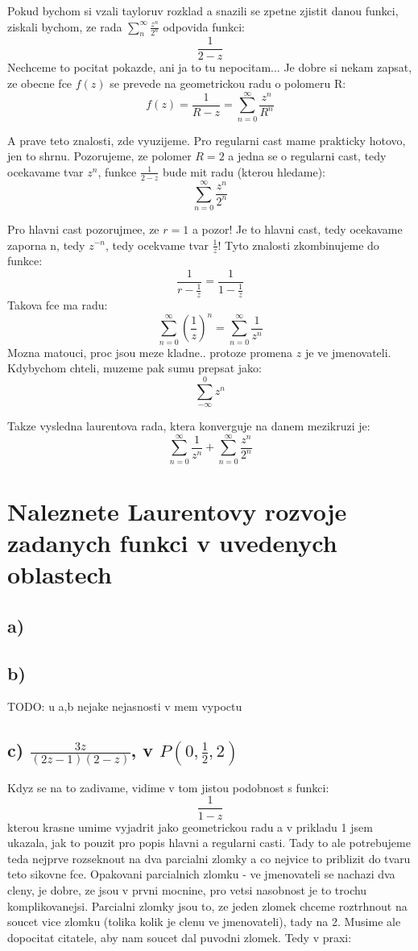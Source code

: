 Pokud bychom si vzali tayloruv rozklad a snazili se zpetne zjistit danou funkci, ziskali bychom, ze rada $\sum_n^\infty \frac{z^n}{2^n}$ odpovida funkci:
$$\frac{1}{2-z}$$
Nechceme to pocitat pokazde, ani ja to tu nepocitam... Je dobre si nekam zapsat, ze obecne fce $f(z)$ se prevede na geometrickou radu o polomeru R:
$$f(z) = \frac{1}{R-z} = \sum_{n=0}^\infty \frac{z^n}{R^n}$$

A prave teto znalosti, zde vyuzijeme. Pro regularni cast mame prakticky hotovo, jen to shrnu. Pozorujeme, ze polomer $R=2$ a jedna se o regularni cast, tedy ocekavame tvar $z^n$, funkce
$\frac{1}{2-z}$ bude mit radu (kterou hledame):
$$\sum_{n = 0}^\infty \frac{z^n}{2^n}$$

Pro hlavni cast pozorujmee, ze $r = 1$ a pozor! Je to hlavni cast, tedy ocekavame zaporna n, tedy $z^{-n}$, tedy ocekvame tvar $\frac{1}{z}$!
Tyto znalosti zkombinujeme do funkce:
$$\frac{1}{r-\frac{1}{z}} = \frac{1}{1-\frac{1}{z}}$$
Takova fce ma radu:
$$\sum_{n=0}^\infty \left( \frac{1}{z} \right)^n = \sum_{n=0} ^\infty \frac{1}{z^n}$$
Mozna matouci, proc jsou meze kladne.. protoze promena $z$ je ve jmenovateli. Kdybychom chteli, muzeme pak sumu prepsat jako:
$$\sum_{-\infty}^0 z^n$$

Takze vysledna laurentova rada, ktera konverguje na danem mezikruzi je:
$$\sum_{n=0} ^\infty \frac{1}{z^n}+\sum_{n = 0}^\infty \frac{z^n}{2^n}$$

\newpage

\section{Naleznete Laurentovy rozvoje zadanych funkci v uvedenych oblastech}
\subsection{a)}
\subsection{b)}
TODO: u a,b nejake nejasnosti v mem vypoctu

\subsection{c) $\frac{3z}{(2z-1)(2-z)}$, v $P(0,\frac{1}{2},2)$}
Kdyz se na to zadivame, vidime v tom jistou podobnost s funkci:
$$\frac{1}{1-z}$$
kterou krasne umime vyjadrit jako geometrickou radu a v prikladu 1 jsem ukazala, jak to pouzit pro popis hlavni a regularni casti. Tady to ale potrebujeme teda nejprve rozseknout na dva parcialni zlomky a co nejvice to priblizit do tvaru teto sikovne fce. Opakovani parcialnich zlomku - ve jmenovateli se nachazi dva cleny, je dobre, ze jsou v prvni mocnine, pro vetsi nasobnost je to trochu komplikovanejsi. Parcialni zlomky jsou to, ze jeden zlomek chceme roztrhnout na soucet vice zlomku (tolika kolik je clenu ve jmenovateli), tady na 2. Musime ale dopocitat citatele, aby nam soucet dal puvodni zlomek. Tedy v praxi:

